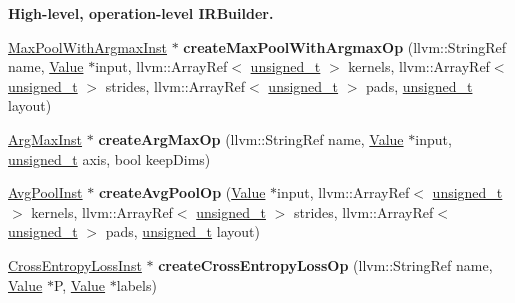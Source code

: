 \begin{Indent}\textbf{ High-\/level, operation-\/level I\+R\+Builder.}\par
\begin{DoxyCompactItemize}
\item 
\mbox{\label{classglow_1_1_i_r_builder_a793289d737a4d74f2ca5d9020922105b}} 
\hyperlink{classglow_1_1_max_pool_with_argmax_inst}{Max\+Pool\+With\+Argmax\+Inst} $\ast$ {\bfseries create\+Max\+Pool\+With\+Argmax\+Op} (llvm\+::\+String\+Ref name, \hyperlink{classglow_1_1_value}{Value} $\ast$input, llvm\+::\+Array\+Ref$<$ \hyperlink{namespaceglow_a0ca574644e1e42ef193a9947fb4d8911}{unsigned\+\_\+t} $>$ kernels, llvm\+::\+Array\+Ref$<$ \hyperlink{namespaceglow_a0ca574644e1e42ef193a9947fb4d8911}{unsigned\+\_\+t} $>$ strides, llvm\+::\+Array\+Ref$<$ \hyperlink{namespaceglow_a0ca574644e1e42ef193a9947fb4d8911}{unsigned\+\_\+t} $>$ pads, \hyperlink{namespaceglow_a0ca574644e1e42ef193a9947fb4d8911}{unsigned\+\_\+t} layout)
\item 
\mbox{\label{classglow_1_1_i_r_builder_a2f1e43764975c46f24883f41208c37ed}} 
\hyperlink{classglow_1_1_arg_max_inst}{Arg\+Max\+Inst} $\ast$ {\bfseries create\+Arg\+Max\+Op} (llvm\+::\+String\+Ref name, \hyperlink{classglow_1_1_value}{Value} $\ast$input, \hyperlink{namespaceglow_a0ca574644e1e42ef193a9947fb4d8911}{unsigned\+\_\+t} axis, bool keep\+Dims)
\item 
\mbox{\label{classglow_1_1_i_r_builder_a696640026207924a269d9ef0a8a287d1}} 
\hyperlink{classglow_1_1_avg_pool_inst}{Avg\+Pool\+Inst} $\ast$ {\bfseries create\+Avg\+Pool\+Op} (\hyperlink{classglow_1_1_value}{Value} $\ast$input, llvm\+::\+Array\+Ref$<$ \hyperlink{namespaceglow_a0ca574644e1e42ef193a9947fb4d8911}{unsigned\+\_\+t} $>$ kernels, llvm\+::\+Array\+Ref$<$ \hyperlink{namespaceglow_a0ca574644e1e42ef193a9947fb4d8911}{unsigned\+\_\+t} $>$ strides, llvm\+::\+Array\+Ref$<$ \hyperlink{namespaceglow_a0ca574644e1e42ef193a9947fb4d8911}{unsigned\+\_\+t} $>$ pads, \hyperlink{namespaceglow_a0ca574644e1e42ef193a9947fb4d8911}{unsigned\+\_\+t} layout)
\item 
\mbox{\label{classglow_1_1_i_r_builder_af6c38718346f32588deecf3759b9d5cd}} 
\hyperlink{classglow_1_1_cross_entropy_loss_inst}{Cross\+Entropy\+Loss\+Inst} $\ast$ {\bfseries create\+Cross\+Entropy\+Loss\+Op} (llvm\+::\+String\+Ref name, \hyperlink{classglow_1_1_value}{Value} $\ast$P, \hyperlink{classglow_1_1_value}{Value} $\ast$labels)

\end{DoxyCompactItemize}
\end{Indent}
